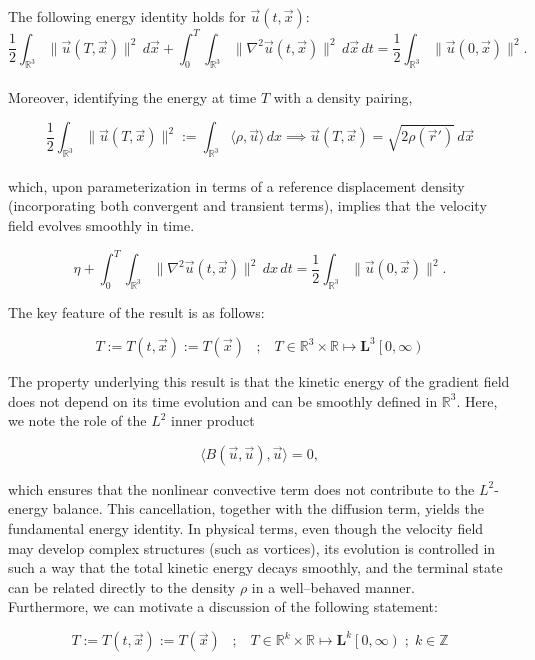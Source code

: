 \documentclass[12pt]{article}
\begin{document}
\begin{lemma}

  The following energy identity holds for $\vec u (t, \vec x)$:
  \[
  \frac{1}{2} \int_{\mathbb{R}^3} \|\vec{u}(T,\vec{x})\|^2 \,d\vec{x} + \int_{0}^{T}\int_{\mathbb{R}^3} \|\nabla^2 \vec{u}(t,\vec{x})\|^2 \,d\vec{x}\,dt = \frac{1}{2} \int_{\mathbb{R}^3} \|\vec{u}(0,\vec{x})\|^2 .
  \] \\ 
  Moreover, identifying the energy at time \(T\) with a density pairing,
    
    \[ \frac{1}{2} \int_{\mathbb{R}^{3}} \|\vec u(T, \vec x)\|^{2} := \int_{\mathbb{R}^{3}} \langle \rho, \vec u\rangle \,dx \implies \vec u (T, \vec x) = \sqrt{2\rho(\vec r')}\,d\vec x\] \\ 
  which, upon parameterization in terms of a reference displacement density (incorporating both convergent and transient terms), implies that the velocity field evolves smoothly in time.

  \[\eta + \int_{0}^{T} \int_{\mathbb{R}^{3}} \|\nabla^{2} \vec u (t, \vec x)\|^{2} \,dx\,dt = \frac{1}{2} \int_{\mathbb{R}^{3}} \|\vec u (0, \vec x)\|^{2}.\]
\end{lemma} 
\quad 
\begin{remark}
  The key feature of the result is as follows: 
  
  \[
  T := T(t, \vec x) := T(\vec x) \;\;\; ; \;\;\; T \in \mathbb{R}^{3}\times \mathbb{R} \mapsto \mathbf{L}^{3} \left[ 0, \infty \right)
  \]
  
  The property underlying this result is that the kinetic energy of the gradient field does not depend on its time evolution and can be smoothly defined in $\mathbb{R}^{3}$. Here, we note the role of the $L^{2}$ inner product 
  
  \[
  \langle B(\vec{u},\vec{u}),\vec{u}\rangle = 0,
  \]
  
  which ensures that the nonlinear convective term does not contribute to the \(L^2\)-energy balance. This cancellation, together with the diffusion term, yields the fundamental energy identity. In physical terms, even though the velocity field may develop complex structures (such as vortices), its evolution is controlled in such a way that the total kinetic energy decays smoothly, and the terminal state can be related directly to the density \(\rho\) in a well–behaved manner. \\

  Furthermore, we can motivate a discussion of the following statement: 

  \[
  T := T(t, \vec x) := T(\vec x) \;\;\; ; \;\;\; T \in \mathbb{R}^{k}\times \mathbb{R} \mapsto \mathbf{L}^{k} \left[ 0, \infty \right) \;;\; k \in \mathbb{Z}
  \]
\end{remark}
\end{document}
